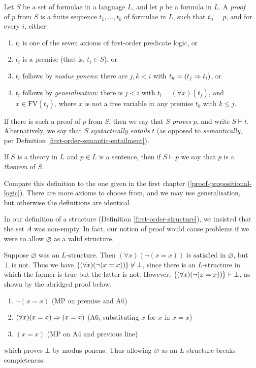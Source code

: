 \documentclass{article}
\begin{document}
\begin{definition}[Proof]
    Let $S$ be a set of formulae in a language $L$, and let $p$ be a formula in $L$. A \textit{proof} of $p$ from $S$ is a finite sequence $t_1, \dots, t_k$ of formulae in $L$, such that $t_n = p$, and for every $i$, either:
    \begin{enumerate}
	    \item $t_i$ is one of the seven axioms of first-order predicate logic, or
	    \item $t_i$ is a premise (that is, $t_i \in S$), or
	    \item $t_i$ follows by \textit{modus ponens}: there are $j,k < i$ with $t_k = (t_j \Rightarrow t_i)$, or
	    \item $t_i$ follows by \textit{generalisation}: there is $j < i$ with $t_i = (\forall x)(t_j)$, and $x \in \mathrm{FV}(t_j)$, where $x$ is not a free variable in any premise $t_k$ with $k \leq j$.
	\end{enumerate}
	If there is such a proof of $p$ from $S$, then we say that $S$ \textit{proves} $p$, and write $S \vdash t$. Alternatively, we say that $S$ \textit{syntactically entails} $t$ (as opposed to \textit{semantically}, per Definition \ref{first-order-semantic-entailment}).
	
	If $S$ is a theory in $L$ and $p \in L$ is a sentence, then if $S \vdash p$ we say that $p$ is a \textit{theorem} of $S$.
\end{definition}

Compare this definition to the one given in the first chapter (\ref{proof-propositional-logic}). There are more axioms to choose from, and we may use generalisation, but otherwise the definitions are identical.

\begin{remark}
	\label{no-empty-set-simplifying-first-order}
    In our definition of a structure (Definition \ref{first-order-structure}), we insisted that the set $A$ was non-empty. In fact, our notion of proof would cause problems if we were to allow $\varnothing$ as a valid structure.
    
    Suppose $\varnothing$ was an $L$-structure. Then $(\forall x)(\lnot(x=x))$ is satisfied in $\varnothing$, but $\bot$ is not. Thus we have $\left\lbrace (\forall x)(\lnot(x=x)) \right\rbrace \not\vDash \bot$, since there is an $L$-structure in which the former is true but the latter is not. However, $\left\lbrace (\forall x)(\lnot(x=x)) \right\rbrace\vdash \bot$, as shown by the abridged proof below:
    \begin{enumerate}
	    \item $\lnot (x = x)$ \hfill (MP on premise and A6)
	    \item $(\forall x)(x = x) \Rightarrow (x = x)$ \hfill (A6, substituting $x$ for $x$ in  $x=x$)
	    \item $(x = x)$ \hfill (MP on A4 and previous line)
	\end{enumerate}
	which proves $\bot$ by modus ponens. Thus allowing $\varnothing$ as an $L$-structure breaks completeness.
\end{remark}
\end{document}
